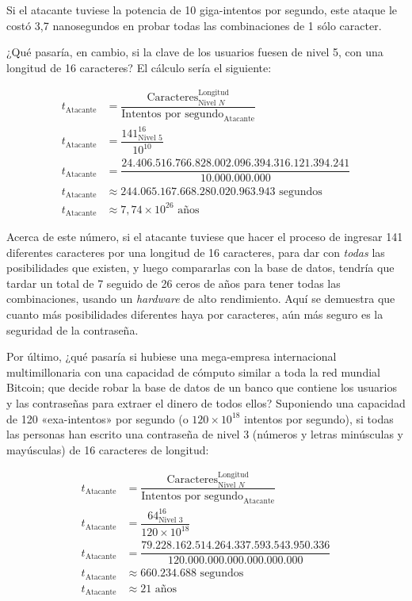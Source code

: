\documentclass[12pt,a4paper,twoside]{book}
\begin{document}
Si el atacante tuviese la potencia de 10 giga-intentos por segundo, este ataque le costó 3,7 nanosegundos en probar todas las combinaciones de 1 sólo caracter.

¿Qué pasaría, en cambio, si la clave de los usuarios fuesen de nivel 5, con una longitud de 16 caracteres? El cálculo sería el siguiente:

\begin{align*}
t_{\text{Atacante}} &= \dfrac{\text{Caracteres}^{\text{Longitud}}_{\text{Nivel } N}}{\text{Intentos por segundo}_\text{Atacante}} \\
t_{\text{Atacante}} &= \dfrac{141^{16}_{\text{Nivel } 5}}{10^{10}} \\
t_{\text{Atacante}} &= \dfrac{24.406.516.766.828.002.096.394.316.121.394.241}{10.000.000.000} \\
t_{\text{Atacante}} &\approx 244.065.167.668.280.020.963.943 \text{ segundos} \\
t_{\text{Atacante}} &\approx 7,74 \times 10^{26} \text{ años}
\end{align*}

Acerca de este número, si el atacante tuviese que hacer el proceso de ingresar 141 diferentes caracteres por una longitud de 16 caracteres, para dar con \textit{todas} las posibilidades que existen, y luego compararlas con la base de datos, tendría que tardar un total de 7 seguido de 26 ceros de años para tener todas las combinaciones, usando un \textit{hardware} de alto rendimiento. Aquí se demuestra que cuanto más posibilidades diferentes haya por caracteres, aún más seguro es la seguridad de la contraseña.

Por último, ¿qué pasaría si hubiese una mega-empresa internacional multimillonaria con una capacidad de cómputo similar a toda la red mundial Bitcoin; que decide robar la base de datos de un banco que contiene los usuarios y las contraseñas para extraer el dinero de todos ellos? Suponiendo una capacidad de 120 «exa-intentos» por segundo (o $ 120 \times 10^{18} $ intentos por segundo), si todas las personas han escrito una contraseña de nivel 3 (números y letras minúsculas y mayúsculas) de 16 caracteres de longitud:

\begin{align*}
t_{\text{Atacante}} &= \dfrac{\text{Caracteres}^{\text{Longitud}}_{\text{Nivel } N}}{\text{Intentos por segundo}_\text{Atacante}} \\
t_{\text{Atacante}} &= \dfrac{64^{16}_{\text{Nivel } 3}}{120 \times 10^{18}} \\
t_{\text{Atacante}} &= \dfrac{79.228.162.514.264.337.593.543.950.336}{120.000.000.000.000.000.000} \\
t_{\text{Atacante}} &\approx 660.234.688 \text{ segundos} \\
t_{\text{Atacante}} &\approx 21 \text{ años}
\end{align*}
\end{document}
